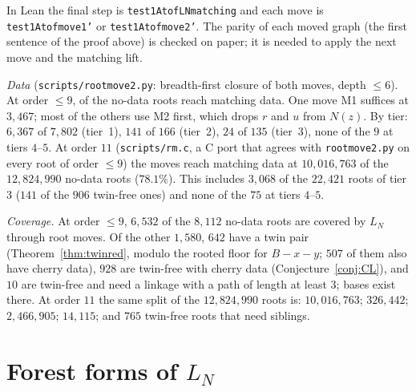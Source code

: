 \documentclass[11pt]{amsart}
\theoremstyle{definition}
\theoremstyle{remark}
\renewcommand{\_}{\oldunderscore\allowbreak}
\begin{document}
In Lean the final step is \texttt{test1At\_of\_LN\_matching} and each move is
\texttt{test1At\_of\_move1'} or \texttt{test1At\_of\_move2'}. The parity of each moved graph (the
first sentence of the proof above) is checked on paper; it is needed to apply the next move and the
matching lift.

\emph{Data} (\texttt{scripts/rootmove2.py}: breadth-first closure of both moves, depth $\le6$). At
order $\le9$, \RMNINEREACH{} of the \NDNINE{} no-data roots reach matching data. One move M1
suffices at $3{,}467$; most of the others use M2 first, which drops $r$ and $u$ from $N(z)$. By
tier: $6{,}367$ of $7{,}802$ (tier~1), $141$ of $166$ (tier~2), $24$ of $135$ (tier~3), none of the
$9$ at tiers $4$--$5$. At order $11$ (\texttt{scripts/rm.c}, a C port that agrees with \texttt{rootmove2.py} on every
root of order $\le9$) the moves reach matching data at $10{,}016{,}763$ of the $12{,}824{,}990$
no-data roots ($78.1\%$). This includes $3{,}068$ of the $22{,}421$ roots of tier $3$ ($141$ of the
$906$ twin-free ones) and none of the $75$ at tiers $4$--$5$.

\emph{Coverage.} At order $\le9$, $6{,}532$ of the $8{,}112$ no-data roots are covered by $L_N$
through root moves. Of the other $1{,}580$, $642$ have a twin pair (Theorem~\ref{thm:twinred},
modulo the rooted floor for $B-x-y$; $507$ of them also have cherry data), $928$ are twin-free with
cherry data (Conjecture~\ref{conj:CL}), and $10$ are twin-free and need a
linkage with a path of length at least $3$; bases exist there. At order $11$ the same split of the
$12{,}824{,}990$ roots is: $10{,}016{,}763$; $326{,}442$; $2{,}466{,}905$; $14{,}115$; and $765$
twin-free roots that need siblings.

\section{Forest forms of \texorpdfstring{$L_N$}{L\_N}}\label{sec:forest}
\end{document}
